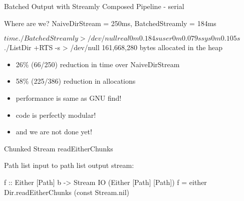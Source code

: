 \documentclass[17pt]{beamer}
\begin{document}
\begin{frame}[fragile]{Batched Output with Streamly}
{Composed Pipeline - serial}
\end{frame}

\begin{frame}[fragile]{Where are we?}
{NaiveDirStream = 250ms, BatchedStreamly = 184ms }

\begin{code}
$ time ./BatchedStreamly > /dev/null
real    0m0.184s
user    0m0.079s
sys     0m0.105s

$ ./ListDir +RTS -s > /dev/null
     161,668,280 bytes allocated in the heap
\end{code}

\scriptsize
\begin{itemize}
\item 26\% (66/250) reduction in time over NaiveDirStream
\item 58\% (225/386) reduction in allocations
\item performance is same as GNU find!
\item code is perfectly modular!
\item and we are not done yet!
\end{itemize}
\end{frame}

%

\begin{frame}[fragile]{Chunked Stream}
{readEitherChunks}


Path list input to path list output stream:
\begin{code}
f :: Either [Path] b
  -> Stream IO (Either [Path] [Path])
f = either Dir.readEitherChunks (const Stream.nil)

\end{code}
\end{frame}
\end{document}

